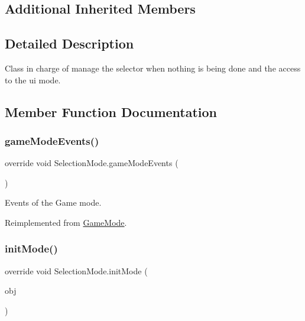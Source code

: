\subsection*{Additional Inherited Members}


\subsection{Detailed Description}
Class in charge of manage the selector when nothing is being done and the access to the ui mode. 



\subsection{Member Function Documentation}
\mbox{\label{class_selection_mode_a72054e5ce70eca2fbc50e8762a9d8c70}} 
\subsubsection{\texorpdfstring{game\+Mode\+Events()}{gameModeEvents()}}
{\footnotesize\ttfamily override void Selection\+Mode.\+game\+Mode\+Events (\begin{DoxyParamCaption}{ }\end{DoxyParamCaption})\hspace{0.3cm}{\ttfamily [virtual]}}



Events of the Game mode. 



Reimplemented from \mbox{\hyperlink{class_game_mode_a32a61bf0dfef83cfc1724b92f3d50cdf}{Game\+Mode}}.

\mbox{\label{class_selection_mode_a6a73f2cb41889a41fcffaa417119d921}} 
\subsubsection{\texorpdfstring{init\+Mode()}{initMode()}}
{\footnotesize\ttfamily override void Selection\+Mode.\+init\+Mode (\begin{DoxyParamCaption}\item[{\mbox{\hyperlink{class_selectable_object}{Selectable\+Object}}}]{obj }\end{DoxyParamCaption})\hspace{0.3cm}{\ttfamily [virtual]}}



